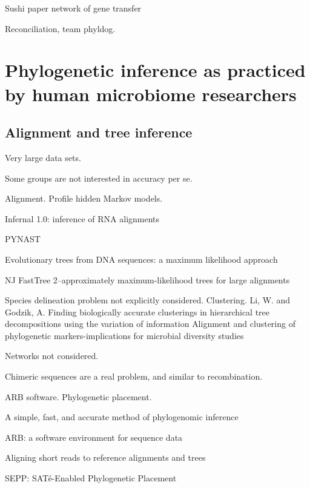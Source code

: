 \documentclass{amsart}
\begin{document}
Sushi paper \cite{hehemann2010transfer}
network of gene transfer \cite{smillie2011ecology}

Reconciliation, team phyldog.


\section{Phylogenetic inference as practiced by human microbiome researchers}

\subsection{Alignment and tree inference}

Very large data sets.

Some groups are not interested in accuracy per se.

Alignment.
\citep{eddy1998profile}
Profile hidden Markov models.

\citep{nawrocki2009infernal}
Infernal 1.0: inference of RNA alignments

PYNAST


\citep{felsenstein1981evolutionary}
{Evolutionary trees from DNA sequences: a maximum likelihood approach}

NJ
\citep{price2010fasttree}
{FastTree 2--approximately maximum-likelihood trees for large alignments}

Species delineation problem not explicitly considered. Clustering.
\citep{li2006cdhit}
Li, W.  and Godzik, A.
\citep{edgar2010usearch}
\citep{navlakha2009finding} Finding biologically accurate clusterings in hierarchical tree decompositions using the variation of information
\citep{white2010alignment} Alignment and clustering of phylogenetic markers-implications for microbial diversity studies

Networks not considered.

Chimeric sequences are a real problem, and similar to recombination.

ARB software.
Phylogenetic placement.

\citep{wu2008simple}
A simple, fast, and accurate method of phylogenomic inference

\citep{matsen2010pplacer}

\citep{ludwig2004arb}
{{ARB}: a software environment for sequence data}
\citep{berger2011performance}

\citep{berger2011aligning}
Aligning short reads to reference alignments and trees

\citep{mirarabsepp}
{SEPP: SAT{\'e}-Enabled Phylogenetic Placement}
\end{document}

